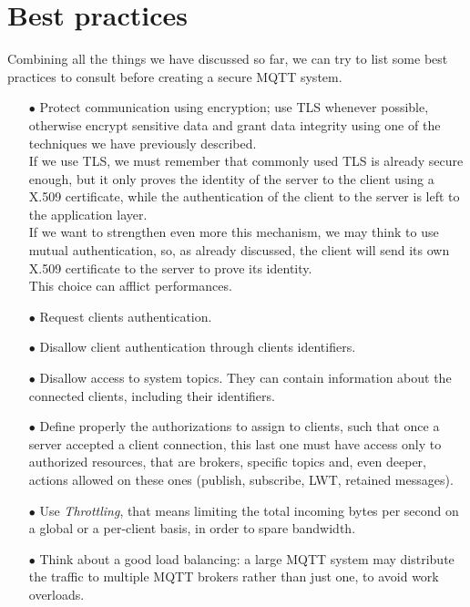 \documentclass[12pt]{report}
\begin{document}
{\section{Best practices}
\label{sec:mqttbestpractices}
\bigskip
Combining all the things we have discussed so far, we can try to list some best practices to consult before creating a secure MQTT system.
\bigskip
\begin{itemize}
\setlength{\itemindent}{+4mm}
\item[$\bullet$] Protect communication using encryption; use TLS whenever possible, otherwise encrypt sensitive data and grant data integrity using one of the techniques we have previously described.\\
If we use TLS, we must remember that commonly used TLS is already secure enough, but it only proves the identity of the server to the client using a X.509 certificate, while the authentication of the client to the server is left to the application layer.\\
If we want to strengthen even more this mechanism, we may think to use mutual authentication, so, as already discussed, the client will send its own X.509 certificate to the server to prove its identity.\\
This choice can afflict performances.
\item[$\bullet$] Request clients authentication.%
\item[$\bullet$] Disallow client authentication through clients identifiers.
\item[$\bullet$] Disallow access to system topics. They can contain information about the connected clients, including their identifiers.
\item[$\bullet$] Define properly the authorizations to assign to clients, such that once a server accepted a client connection, this last one must have access only to authorized resources, that are brokers, specific topics and, even deeper, actions allowed on these ones (publish, subscribe, LWT, retained messages).
\item[$\bullet$] Use \emph{Throttling}, that means limiting the total incoming bytes per second on a global or a per-client basis, in order to spare bandwidth.
\item[$\bullet$] Think about a good load balancing: a large MQTT system may distribute the traffic to multiple MQTT brokers rather than just one, to avoid work overloads.\\

\end{itemize}}
\end{document}
